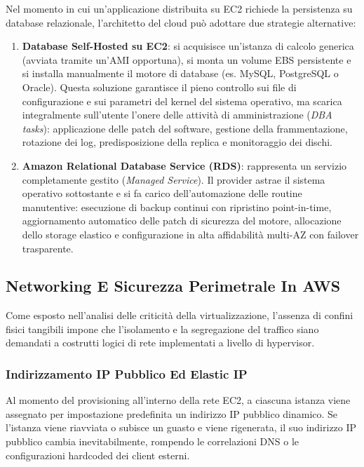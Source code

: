 \documentclass[11pt, a4paper]{article}
\begin{document}
Nel momento in cui un'applicazione distribuita su EC2 richiede la persistenza su database relazionale, l'architetto del cloud può adottare due strategie alternative:

\begin{enumerate}
    \item \textbf{Database Self-Hosted su EC2}: si acquisisce un'istanza di calcolo generica (avviata tramite un'AMI opportuna), si monta un volume EBS persistente e si installa manualmente il motore di database (es. MySQL, PostgreSQL o Oracle). Questa soluzione garantisce il pieno controllo sui file di configurazione e sui parametri del kernel del sistema operativo, ma scarica integralmente sull'utente l'onere delle attività di amministrazione (\emph{DBA tasks}): applicazione delle patch del software, gestione della frammentazione, rotazione dei log, predisposizione della replica e monitoraggio dei dischi.
    \item \textbf{Amazon Relational Database Service (RDS)}: rappresenta un servizio completamente gestito (\emph{Managed Service}). Il provider astrae il sistema operativo sottostante e si fa carico dell'automazione delle routine manutentive: esecuzione di backup continui con ripristino point-in-time, aggiornamento automatico delle patch di sicurezza del motore, allocazione dello storage elastico e configurazione in alta affidabilità multi-AZ con failover trasparente.
\end{enumerate}

\subsection{Networking E Sicurezza Perimetrale In AWS}

Come esposto nell'analisi delle criticità della virtualizzazione, l'assenza di confini fisici tangibili impone che l'isolamento e la segregazione del traffico siano demandati a costrutti logici di rete implementati a livello di hypervisor.

\subsubsection{Indirizzamento IP Pubblico Ed Elastic IP}
Al momento del provisioning all'interno della rete EC2, a ciascuna istanza viene assegnato per impostazione predefinita un indirizzo IP pubblico dinamico. Se l'istanza viene riavviata o subisce un guasto e viene rigenerata, il suo indirizzo IP pubblico cambia inevitabilmente, rompendo le correlazioni DNS o le configurazioni hardcoded dei client esterni.
\end{document}
